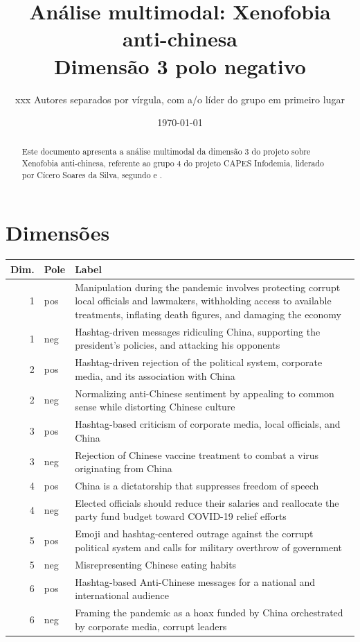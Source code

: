 \documentclass[aspectratio=169]{article}
\title{Análise multimodal: Xenofobia anti-chinesa\\Dimensão 3 polo negativo}
\author{xxx Autores separados por vírgula, com a/o líder do grupo em primeiro lugar}
\date{\today}
\begin{document}
\maketitle

\begin{abstract}
Este documento apresenta a análise multimodal da dimensão 3 do projeto sobre Xenofobia anti-chinesa, referente ao grupo 4 do projeto CAPES Infodemia, liderado por Cícero Soares da Silva, segundo  e .
\end{abstract}

\section{Dimensões}

\begin{table}[H]
\begin{tabular}{r l  p{}} \hline
Dim.&Pole& Label \\ \hline
1&pos&Manipulation during the pandemic involves protecting corrupt local officials and lawmakers, withholding access to available treatments, inflating death figures, and damaging the economy \\
1&neg&Hashtag-driven messages ridiculing China, supporting the president's policies, and attacking his opponents \\ \hline
2&pos&Hashtag-driven rejection of the political system, corporate media, and its association with China \\
2&neg&Normalizing anti-Chinese sentiment by appealing to common sense while distorting Chinese culture \\  \hline
3&pos&Hashtag-based criticism of corporate media, local officials, and China \\
3&neg&Rejection of Chinese vaccine treatment to combat a virus originating from China \\  \hline
4&pos&China is a dictatorship that suppresses freedom of speech  \\
4&neg&Elected officials should reduce their salaries and reallocate the party fund budget toward COVID-19 relief efforts \\  \hline
5&pos&Emoji and hashtag-centered outrage against the corrupt political system and calls for military overthrow of government  \\
5&neg&Misrepresenting Chinese eating habits \\  \hline
6&pos&Hashtag-based Anti-Chinese messages for a national and international audience  \\
6&neg&Framing the pandemic as a hoax funded by China orchestrated by corporate media, corrupt leaders \\
\hline
\end{tabular}
\end{table}
\end{document}
